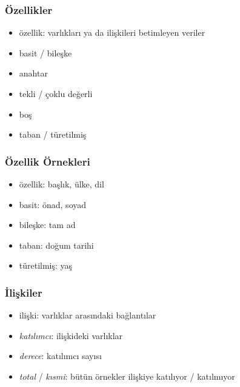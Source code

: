 \documentclass[dvipsnames]{beamer}
\theoremstyle{theorem}
\begin{document}
\begin{frame}
  \frametitle{Özellikler}

  \begin{itemize}
    \item \alert{özellik}: varlıkları ya da ilişkileri betimleyen veriler

    \medskip
    \item basit / bileşke
    \item anahtar
    \item tekli / çoklu değerli
    \item boş
    \item taban / türetilmiş
  \end{itemize}

\end{frame}

\begin{frame}
  \frametitle{Özellik Örnekleri}

    \begin{itemize}
      \item özellik: başlık, ülke, dil

      \pause
      \medskip
      \item basit: önad, soyad
      \item bileşke: tam ad

      \pause
      \medskip
      \item taban: doğum tarihi
      \item türetilmiş: yaş
    \end{itemize}
\end{frame}

\begin{frame}
  \frametitle{İlişkiler}

  \begin{itemize}
    \item \alert{ilişki}: varlıklar arasındaki bağlantılar

    \medskip

      \item \emph{katılımcı}: ilişkideki varlıklar
      \item \emph{derece}: katılımcı sayısı
      \item \emph{total} / \emph{kısmi}: bütün örnekler ilişkiye
        katılıyor / katılmıyor
    \end{itemize}
\end{frame}
\end{document}
